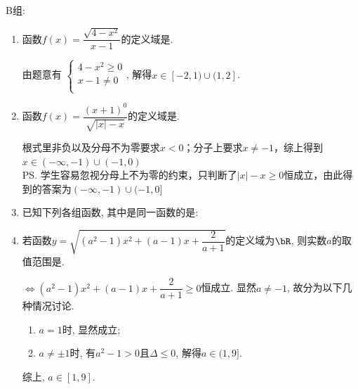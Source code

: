 B组: 
\begin{enumerate}
\item 函数$f(x)=\dfrac{\sqrt{4-x^2}}{x-1}$的定义域是\blkda[3]{$[-2,1)\cup(1,2]$}.
\begin{jieda}
由题意有 
$\begin{cases}
4-x^2\geq 0\\
x-1\neq 0\\
\end{cases}$, 
解得$x\in[-2,1)\cup(1,2]$.
\end{jieda}


\item 函数$f(x)=\dfrac{(x+1)^0}{\sqrt{|x|-x}}$的定义域是.
\begin{jieda}
根式里非负以及分母不为零要求$x < 0$；分子上要求$x \neq -1$，综上得到$x \in (-\infty, -1) \cup (-1, 0)$ \\
\ps 学生容易忽视分母上不为零的约束，只判断了$|x| - x \geq 0$恒成立，由此得到的答案为$(-\infty, -1) \cup (-1, 0]$
\end{jieda}

\item 已知下列各组函数, 其中是同一函数的是:

\item 若函数$y=\sqrt{(a^2-1)x^2+(a-1)x+\dfrac{2}{a+1}}$的定义域为$\bR$, 则实数$a$的取值范围是\blkda{$[1,9]$}. 
\begin{jieda}
$\iff (a^2-1)x^2+(a-1)x+\dfrac{2}{a+1}\geq 0$恒成立. 显然$a\neq -1$, 故分为以下几种情况讨论. 
\begin{enumerate}[(1)]
\item $a=1$时, 显然成立; 
\item $a\neq\pm1$时, 有$a^2-1>0$且$\Delta\leq 0$, 解得$a\in(1,9]$. 
\end{enumerate}
综上, $a\in[1,9]$. 
\end{jieda}


\end{enumerate}
